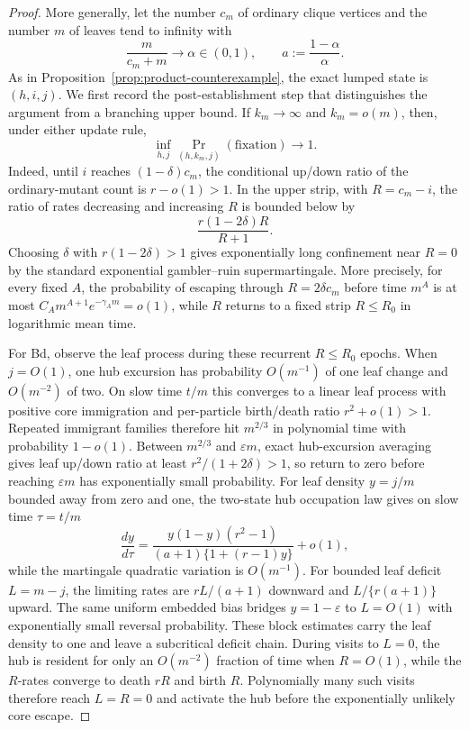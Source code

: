\documentclass[11pt]{article}
\theoremstyle{definition}
\theoremstyle{remark}
\begin{document}
\begin{proof}
More generally, let the number $c_m$ of ordinary clique vertices and the
number $m$ of leaves tend to infinity with
\[
 \frac{m}{c_m+m}\longrightarrow\alpha\in(0,1),\qquad
 a:=\frac{1-\alpha}{\alpha}.
\]
As in Proposition~\ref{prop:product-counterexample}, the exact lumped state
is $(h,i,j)$.  We first record the post-establishment step that distinguishes
the argument from a branching upper bound.  If $k_m\to\infty$ and
$k_m=o(m)$, then, under either update rule,
\begin{equation}
 \inf_{h,j}\Pr_{(h,k_m,j)}(\text{fixation})\longrightarrow1.
 \label{eq:mesoscopic-core-fixes}
\end{equation}
Indeed, until $i$ reaches $(1-\delta)c_m$, the conditional up/down ratio of
the ordinary-mutant count is $r-o(1)>1$.  In the upper strip, with
$R=c_m-i$, the ratio of rates decreasing and increasing $R$ is bounded below
by
\[
                 \frac{r(1-2\delta)R}{R+1}.
\]
Choosing $\delta$ with $r(1-2\delta)>1$ gives exponentially long confinement
near $R=0$ by the standard exponential gambler--ruin supermartingale.  More
precisely, for every fixed $A$, the probability of escaping through
$R=2\delta c_m$ before time $m^A$ is at most
$C_A m^{A+1}e^{-\gamma_A m}=o(1)$, while $R$ returns to a fixed strip
$R\leq R_0$ in logarithmic mean time.

For Bd, observe the leaf process during these recurrent $R\leq R_0$ epochs.
When $j=O(1)$, one hub excursion has probability $O(m^{-1})$ of one leaf
change and $O(m^{-2})$ of two.  On slow time $t/m$ this converges to a linear
leaf process with positive core immigration and per-particle birth/death
ratio $r^2+o(1)>1$.  Repeated immigrant families therefore hit
$m^{2/3}$ in polynomial time with probability $1-o(1)$.  Between
$m^{2/3}$ and $\varepsilon m$, exact hub-excursion averaging gives leaf
up/down ratio at least $r^2/(1+2\delta)>1$, so return to zero before reaching
$\varepsilon m$ has exponentially small probability.  For leaf density
$y=j/m$ bounded
away from zero and one, the two-state hub occupation law gives on slow time
$\tau=t/m$
\[
 \frac{dy}{d\tau}
 =\frac{y(1-y)(r^2-1)}{(a+1)\{1+(r-1)y\}}+o(1),
\]
while the martingale quadratic variation is $O(m^{-1})$.  For bounded leaf
deficit $L=m-j$, the limiting rates are $rL/(a+1)$ downward and
$L/\{r(a+1)\}$ upward.  The same uniform embedded bias bridges
$y=1-\varepsilon$ to $L=O(1)$ with exponentially small reversal
probability.  These block estimates carry the leaf density to one and leave
a subcritical deficit chain.  During visits to $L=0$, the hub is
resident for only an $O(m^{-2})$ fraction of time when $R=O(1)$, while the
$R$-rates converge to death $rR$ and birth $R$.  Polynomially many such
visits therefore reach $L=R=0$ and activate the hub before the exponentially
unlikely core escape.


\end{proof}
\end{document}
